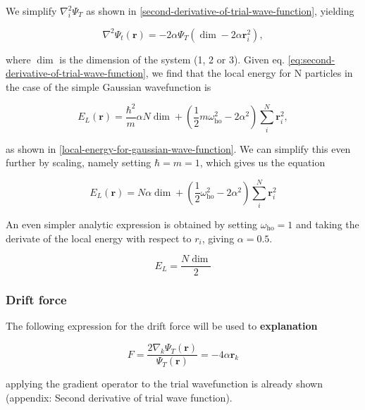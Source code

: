 \documentclass[
]{article}
\begin{document}
We simplify \(\nabla_i^2\Psi_T\) as shown in
\ref{second-derivative-of-trial-wave-function}, yielding

\begin{equation}\nabla^2\Psi_t(\mathbf r) = -2\alpha\Psi_T\left(\dim - 2\alpha\mathbf r_i^2\right),\label{eq:second-derivative-of-trial-wave-function}\end{equation}

where \(\dim\) is the dimension of the system (1, 2 or 3). Given eq.
\eqref{eq:second-derivative-of-trial-wave-function}, we find that the
local energy for N particles in the case of the simple Gaussian
wavefunction is

\begin{equation} E_L(\mathbf{r}) = \frac{\hbar^2 }{m} \alpha N \dim +  \left( \frac{1}{2} m \omega^2_\text{ho} - 2 \alpha^2\right)  \sum_i^N \mathbf{r}^2_{i},\label{eq:local-energy-gauss}\end{equation}

as shown in \ref{local-energy-for-gaussian-wave-function}. We can
simplify this even further by scaling, namely setting \(\hbar = m = 1\),
which gives us the equation

\begin{equation}E_L(\mathbf{r}) = N\alpha  \dim  + \left(\frac{1}{2} \omega^2_\text{ho} - 2 \alpha^2\right) \sum_i^N \mathbf{r}^2_{i}\label{eq:local-energy-gauss-scaled}\end{equation}

An even simpler analytic expression is obtained by setting
\(\omega_{\text{ho}} = 1\) and taking the derivate of the local energy
with respect to \(r_i\), giving \(\alpha= 0.5\).

\begin{equation}E_L = \frac{N \dim}{2}\label{eq:local-energy-min}\end{equation}

\hypertarget{drift-force}{%
\subsubsection{Drift force}\label{drift-force}}

The following expression for the drift force will be used to
\textbf{explanation}

\[ F = \frac{2 \nabla_k \Psi_T(\mathbf{r})}{\Psi_T(\mathbf{r})} = -4 \alpha \mathbf{r}_{k} \]

applying the gradient operator to the trial wavefunction is already
shown (appendix: Second derivative of trial wave function).
\end{document}
